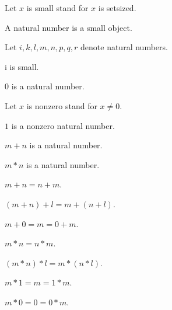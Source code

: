 \documentclass[11pt]{article}
\begin{document}
\begin{forthel}

Let $x$ is small stand for $x$ is setsized.

\begin{signature}  A natural number is a small object.
\end{signature}

Let $i,k,l,m,n,p,q,r$ denote natural numbers.

\begin{lemma} i is small. \end{lemma}

\begin{signature} $0$ is a natural number.
\end{signature}

Let $x$ is nonzero stand for $x \neq 0$.

\begin{signature} $1$ is a nonzero natural number.
\end{signature}

\begin{signature} $m + n$ is a natural number.
\end{signature}

\begin{signature} $m * n$ is a natural number.
\end{signature}

\begin{axiom} $m + n = n + m$.
\end{axiom}

\begin{axiom} $(m + n) + l = m + (n + l)$.
\end{axiom}

\begin{axiom}  $m + 0 = m = 0 + m$.
\end{axiom}

\begin{axiom} $m * n = n * m$.
\end{axiom}

\begin{axiom} $(m * n) * l = m * (n * l)$.
\end{axiom}

\begin{axiom} $m * 1 = m = 1 * m$.
\end{axiom}

\begin{axiom} $m * 0 = 0 = 0 * m$.
\end{axiom}


\end{forthel}
\end{document}
